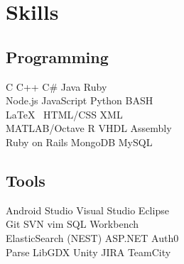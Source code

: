 ﻿\documentclass[letterpaper]{deedy-resume} %
\begin{document}

\lastupdated



\begin{minipage}[t]{0.33\textwidth} %


        \section{Skills}

        \subsection{Programming}

        C \textbullet{} C++ \textbullet{} C\# \textbullet{} Java \textbullet{} Ruby\\
        Node.js \textbullet{} JavaScript \textbullet{} Python \textbullet{} BASH \\
        \LaTeX\ \textbullet{} HTML/CSS \textbullet{} XML \\

        MATLAB/Octave \textbullet{} R \textbullet{} VHDL \textbullet{} Assembly\\
        Ruby on Rails \textbullet{} MongoDB \textbullet{} MySQL\\

        \sectionspace %

        \subsection{Tools}
        Android Studio \textbullet{} Visual Studio \textbullet{} Eclipse \\
        Git \textbullet{} SVN \textbullet{} vim \textbullet{} SQL Workbench \\
        ElasticSearch (NEST)\textbullet{} ASP.NET \textbullet{} Auth0 \\
        Parse \textbullet{} LibGDX \textbullet{} Unity \textbullet{} JIRA \textbullet{} TeamCity\\


\end{minipage}
\end{document}
